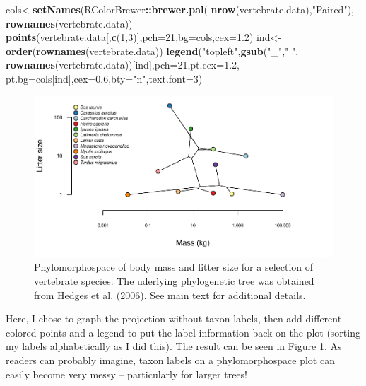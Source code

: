 \documentclass[fleqn,10pt,lineno]{wlpeerj} %
\newenvironment{Shaded}{\begin{snugshade}}{\end{snugshade}}
\newcommand{\AttributeTok}[1]{\textcolor[rgb]{0.13,0.29,0.53}{#1}}
\newcommand{\DecValTok}[1]{\textcolor[rgb]{0.00,0.00,0.81}{#1}}
\newcommand{\FloatTok}[1]{\textcolor[rgb]{0.00,0.00,0.81}{#1}}
\newcommand{\FunctionTok}[1]{\textcolor[rgb]{0.13,0.29,0.53}{\textbf{#1}}}
\newcommand{\NormalTok}[1]{#1}
\newcommand{\OtherTok}[1]{\textcolor[rgb]{0.56,0.35,0.01}{#1}}
\newcommand{\SpecialCharTok}[1]{\textcolor[rgb]{0.81,0.36,0.00}{\textbf{#1}}}
\newcommand{\StringTok}[1]{\textcolor[rgb]{0.31,0.60,0.02}{#1}}
\begin{document}
\begin{Shaded}
\begin{Highlighting}[]
\NormalTok{cols}\OtherTok{\textless{}{-}}\FunctionTok{setNames}\NormalTok{(RColorBrewer}\SpecialCharTok{::}\FunctionTok{brewer.pal}\NormalTok{(}
  \FunctionTok{nrow}\NormalTok{(vertebrate.data),}\StringTok{"Paired"}\NormalTok{),}
  \FunctionTok{rownames}\NormalTok{(vertebrate.data))}
\FunctionTok{points}\NormalTok{(vertebrate.data[,}\FunctionTok{c}\NormalTok{(}\DecValTok{1}\NormalTok{,}\DecValTok{3}\NormalTok{)],}\AttributeTok{pch=}\DecValTok{21}\NormalTok{,}\AttributeTok{bg=}\NormalTok{cols,}\AttributeTok{cex=}\FloatTok{1.2}\NormalTok{)}
\NormalTok{ind}\OtherTok{\textless{}{-}}\FunctionTok{order}\NormalTok{(}\FunctionTok{rownames}\NormalTok{(vertebrate.data))}
\FunctionTok{legend}\NormalTok{(}\StringTok{"topleft"}\NormalTok{,}\FunctionTok{gsub}\NormalTok{(}\StringTok{"\_"}\NormalTok{,}\StringTok{" "}\NormalTok{,}
  \FunctionTok{rownames}\NormalTok{(vertebrate.data))[ind],}\AttributeTok{pch=}\DecValTok{21}\NormalTok{,}\AttributeTok{pt.cex=}\FloatTok{1.2}\NormalTok{,}
  \AttributeTok{pt.bg=}\NormalTok{cols[ind],}\AttributeTok{cex=}\FloatTok{0.6}\NormalTok{,}\AttributeTok{bty=}\StringTok{"n"}\NormalTok{,}\AttributeTok{text.font=}\DecValTok{3}\NormalTok{)}
\end{Highlighting}
\end{Shaded}

\begin{figure}
\includegraphics[width=1\linewidth]{Revell.phytools-v2_peerj_files/figure-latex/fig21-vert-phylomorphospace-1} \caption{Phylomorphospace of body mass and litter size for a selection of vertebrate species. The uderlying phylogenetic tree was obtained from Hedges et al. (2006). See main text for additional details.}\label{fig:fig21-vert-phylomorphospace}
\end{figure}

Here, I chose to graph the projection without taxon labels, then add different colored points and a legend to put the label information back on the plot (sorting my labels alphabetically as I did this). The result can be seen in Figure \ref{fig:fig21-vert-phylomorphospace}. As readers can probably imagine, taxon labels on a phylomorphospace plot can easily become very messy -- particularly for larger trees!
\end{document}
